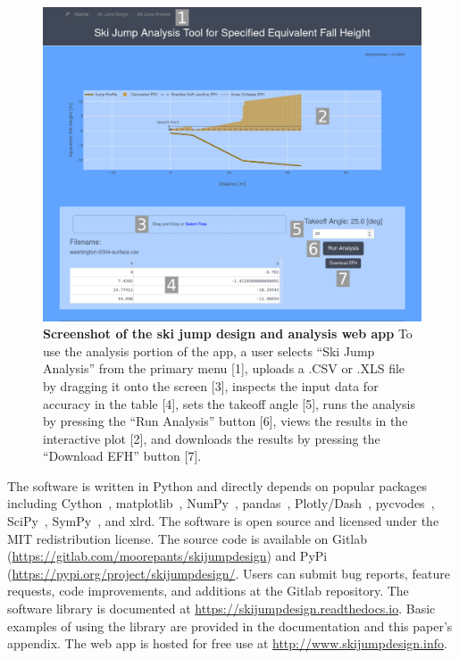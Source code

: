 \documentclass[smallextended]{svjour3}       %
\begin{document}
\begin{figure}
  \centering
  \includegraphics[width=\columnwidth]{figures/web-app-screenshot.png}
  \caption{\textbf{Screenshot of the ski jump design and analysis web app} To
    use the analysis portion of the app, a user selects ``Ski Jump Analysis''
    from the primary menu [1], uploads a .CSV or .XLS file by dragging it onto
    the screen [3], inspects the input data for accuracy in the table [4], sets
    the takeoff angle [5], runs the analysis by pressing the ``Run Analysis''
    button [6], views the results in the interactive plot [2], and downloads
    the results by pressing the ``Download EFH'' button [7].}
  \label{fig:web-app-screenshot}
\end{figure}

The software is written in Python and directly depends on popular packages
including Cython~\cite{Behnel2011}, matplotlib~\cite{Hunter2007},
NumPy~\cite{Oliphant2006}, pandas~\cite{McKinney2020},
Plotly/Dash~\cite{Plotly2015}, pycvodes~\cite{Dahlgren2018},
SciPy~\cite{Virtanen2020}, SymPy~\cite{Meurer2017}, and xlrd. The software is
open source and licensed under the MIT redistribution license. The source code
is available on Gitlab (\url{https://gitlab.com/moorepants/skijumpdesign}) and
PyPi (\url{https://pypi.org/project/skijumpdesign/}. Users can submit bug
reports, feature requests, code improvements, and additions at the Gitlab
repository. The software library is documented at
\url{https://skijumpdesign.readthedocs.io}. Basic examples of using the library
are provided in the documentation and this paper's appendix. The web app is
hosted for free use at \url{http://www.skijumpdesign.info}.
\end{document}
